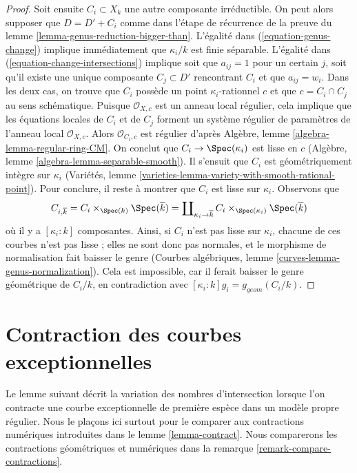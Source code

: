 \begin{proof}
\medskip\noindent
Soit ensuite $C_i \subset X_k$ une autre composante irréductible.
On peut alors supposer que $D = D' + C_i$ comme dans l'étape de récurrence
de la preuve du lemme \ref{lemma-genus-reduction-bigger-than}.
L'égalité dans (\ref{equation-genus-change}) implique immédiatement que
$\kappa_i/k$ est finie séparable. L'égalité dans
(\ref{equation-change-intersections}) implique soit que $a_{ij} = 1$ pour
un certain $j$, soit qu'il existe une unique composante
$C_j \subset D'$ rencontrant $C_i$ et que $a_{ij} = w_i$.
Dans les deux cas, on trouve que $C_i$ possède un point
$\kappa_i$-rationnel $c$ et que $c = C_i \cap C_j$ au sens schématique.
Puisque $\mathcal{O}_{X,c}$ est un anneau local régulier, cela implique que
les équations locales de $C_i$ et de $C_j$ forment un système régulier de
paramètres de l'anneau local $\mathcal{O}_{X,c}$. Alors
$\mathcal{O}_{C_i,c}$ est régulier d'après Algèbre, lemme
\ref{algebra-lemma-regular-ring-CM}. On conclut que
$C_i \to \Spec(\kappa_i)$ est lisse en $c$ (Algèbre, lemme
\ref{algebra-lemma-separable-smooth}). Il s'ensuit que $C_i$ est
géométriquement intègre sur $\kappa_i$ (Variétés, lemme
\ref{varieties-lemma-variety-with-smooth-rational-point}). Pour conclure,
il reste à montrer que $C_i$ est lisse sur $\kappa_i$. Observons que
$$
C_{i, \overline{k}} = C_i \times_{\Spec(k)} \Spec(\overline{k})
= \coprod\nolimits_{\kappa_i \to \overline{k}}
C_i \times_{\Spec(\kappa_i)} \Spec(\overline{k})
$$
où il y a $[\kappa_i : k]$ composantes. Ainsi, si $C_i$ n'est pas lisse
sur $\kappa_i$, chacune de ces courbes n'est pas lisse ; elles ne sont donc
pas normales, et le morphisme de normalisation fait baisser le genre
(Courbes algébriques, lemme \ref{curves-lemma-genus-normalization}). Cela
est impossible, car il ferait baisser le genre géométrique de $C_i/k$, en
contradiction avec $[\kappa_i : k]g_i = g_{geom}(C_i/k)$.
\end{proof}








\section{Contraction des courbes exceptionnelles}
\label{section-contract}

\noindent
Le lemme suivant décrit la variation des nombres d'intersection lorsque
l'on contracte une courbe exceptionnelle de première espèce dans un modèle
propre régulier. Nous le plaçons ici surtout pour le comparer aux
contractions numériques introduites dans le lemme \ref{lemma-contract}.
Nous comparerons les contractions géométriques et numériques dans la
remarque \ref{remark-compare-contractions}.

